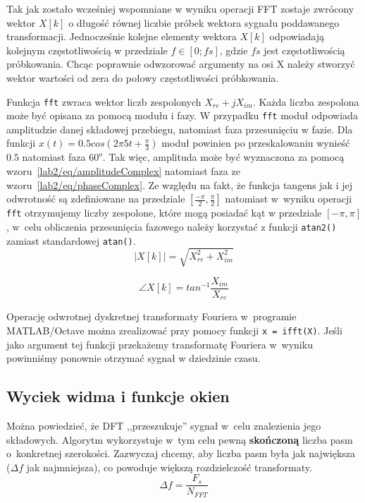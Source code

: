 Tak jak zostało wcześniej wspomniane w wyniku operacji FFT zostaje zwrócony wektor $X[k]$ o długość równej liczbie próbek wektora sygnału poddawanego transformacji. Jednocześnie kolejne elementy wektora $X[k]$ odpowiadają kolejnym częstotliwością w przedziale $f\in[0;fs]$, gdzie $fs$ jest częstotliwością próbkowania. Chcąc poprawnie odwzorować argumenty na osi X należy stworzyć wektor wartości od zera do połowy częstotliwości próbkowania.

Funkcja \texttt{fft} zwraca wektor liczb zespolonych $X_{re} + jX_{im}$. Każda liczba zespolona może być opisana za pomocą modułu i fazy. W przypadku \texttt{fft} moduł odpowiada amplitudzie danej składowej przebiegu, natomiast faza przesunięciu w fazie. Dla funkcji $x(t) = 0.5cos(2\pi 5t + \frac{\pi}{3})$ moduł powinien po przeskalowaniu wynieść $0.5$ natomiast faza $60^o$. Tak więc, amplituda może być wyznaczona za pomocą wzoru~\ref{lab2/eq/amplitudeComplex} natomiast faza ze wzoru~\ref{lab2/eq/phaseComplex}. Ze względu na fakt, że funkcja tangens jak i jej odwrotność są zdefiniowane na przedziale $[\frac{-\pi}{2}, \frac{\pi}{2}]$ natomiast w~wyniku operacji \texttt{fft} otrzymujemy liczby zespolone, które mogą posiadać kąt w przedziale $[-\pi, \pi]$, w~celu obliczenia przesunięcia fazowego należy korzystać z funkcji \texttt{atan2()} zamiast standardowej \texttt{atan()}.
\begin{equation}\label{lab2/eq/amplitudeComplex}
	|X[k]| = \sqrt{X^2 _{re} + X^2 _{im}}
\end{equation}

\begin{equation}\label{lab2/eq/phaseComplex}
	\angle X[k] = tan^{-1} \frac{X_{im}}{X_{re}}
\end{equation}

Operację odwrotnej dyskretnej transformaty Fouriera w~programie MATLAB/Octave można zrealizować przy pomocy funkcji \texttt{x = ifft(X)}. Jeśli jako argument tej funkcji przekażemy transformatę Fouriera w~wyniku powinniśmy ponownie otrzymać sygnał w dziedzinie czasu.


\subsection{Wyciek widma i funkcje okien}
Można powiedzieć, że DFT ,,przeszukuje'' sygnał w~celu znalezienia jego składowych. Algorytm wykorzystuje w~tym celu pewną \textbf{skończoną} liczba pasm o~konkretnej szerokości. Zazwyczaj chcemy, aby liczba pasm była jak największa ($\Delta f$ jak najmniejsza), co powoduje większą rozdzielczość transformaty.
\begin{equation}\label{lab2/lst/frequencyResolution}
	\Delta f = \frac{F_s}{N_{FFT}}
\end{equation}

